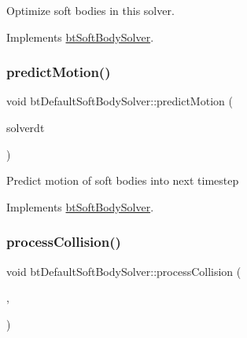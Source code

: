 Optimize soft bodies in this solver. 

Implements \hyperlink{classbtSoftBodySolver_af07da1ec6f11e7873bc5fafef426fcd3}{bt\+Soft\+Body\+Solver}.

\mbox{\label{classbtDefaultSoftBodySolver_a4fc93a921db26b802b6f9fa05d9a7d6b}} 
\subsubsection{\texorpdfstring{predict\+Motion()}{predictMotion()}}
{\footnotesize\ttfamily void bt\+Default\+Soft\+Body\+Solver\+::predict\+Motion (\begin{DoxyParamCaption}\item[{float}]{solverdt }\end{DoxyParamCaption})\hspace{0.3cm}{\ttfamily [virtual]}}

Predict motion of soft bodies into next timestep 

Implements \hyperlink{classbtSoftBodySolver_a72f0c095ae30002a6f98fc194a63e1ba}{bt\+Soft\+Body\+Solver}.

\mbox{\label{classbtDefaultSoftBodySolver_a537aa8ae1601bbafb87ebaf10f5e4e31}} 
\subsubsection{\texorpdfstring{process\+Collision()}{processCollision()}}
{\footnotesize\ttfamily void bt\+Default\+Soft\+Body\+Solver\+::process\+Collision (\begin{DoxyParamCaption}\item[{\hyperlink{classbtSoftBody}{bt\+Soft\+Body} $\ast$}]{,  }\item[{\hyperlink{classbtSoftBody}{bt\+Soft\+Body} $\ast$}]{ }\end{DoxyParamCaption})\hspace{0.3cm}{\ttfamily [virtual]}}

